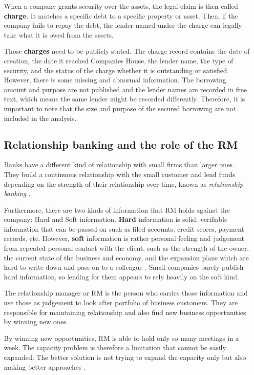 \documentclass[ %
                    author={Natchalin Iwsakul \\[0.4em] Inkaphol Siriwongwattana \\[0.4em] Tanaphan Kummaraphat \\[0.6em] Patorn Srisupap},,
                supervisor={Fernando Moreno-Pino},
                    degree={MSc},
                     title={Propensity Modelling for SME Commercial Lending Using Open Public Data
},
                  subtitle={Companies House and GDELT as predictors of first-time borrowing},
                      type={},
                      year={2026}]{dissertation}
\begin{document}
When a company grants security over the assets, the legal claim is then called \textbf{charge.} It matches a specific debt to a specific property or asset. Then, if the company fails to repay the debt, the lender named under the charge can legally take what it is owed from the assets.

Those \textbf{charges} need to be publicly stated. The charge record contains the date of creation, the date it reached Companies House, the lender name, the type of security, and the status of the charge whether it is outstanding or satisfied. However, there is some missing and abnormal information. The borrowing amount and purpose are not published and the lender names are recorded in free text, which means the same lender might be recorded differently. Therefore, it is important to note that the size and purpose of the secured borrowing are not included in the analysis.

\subsection{Relationship banking and the role of the RM}
\label{sec:rm}

Banks have a different kind of relationship with small firms than larger ones. They build a continuous relationship with the small customer and lend funds depending on the strength of their relationship over time, known as \textit{relationship banking} \cite{boot2000relationship}.

Furthermore, there are two kinds of information that RM holds against the company: Hard and Soft information. \textbf{Hard} information is solid, verifiable information that can be passed on such as filed accounts, credit scores, payment records, etc. However, \textbf{soft} information is rather personal feeling and judgement from repeated personal contact with the client, such as the strength of the owner, the current state of the business and economy, and the expansion plans which are hard to write down and pass on to a colleague \cite{berger2006complete}. Small companies barely publish hard information, so lending for them appears to rely heavily on the soft kind.

The relationship manager or RM is the person who carries those information and use those as judgement to look after portfolio of business customers. They are responsible for maintaining relationship and also find new business opportunities by winning new ones.

By winning new opportunities, RM is able to hold only so many meetings in a week. The capacity problem is therefore a limitation that cannot be easily expanded. The better solution is not trying to expand the capacity only but also making better approaches \cite{dhaen_model}.
\end{document}
